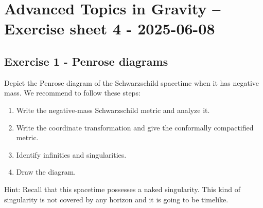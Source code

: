 \documentclass[10pt,a4paper]{article}
\theoremstyle{definition}
\begin{document}
\newpage
\section*{Advanced Topics in Gravity – Exercise sheet 4 - 2025-06-08}
\subsection*{Exercise 1 - Penrose diagrams}
{\color{blue} 
Depict the Penrose diagram of the Schwarzschild spacetime when it has negative mass. We recommend to follow these steps:
\begin{enumerate}
\item Write the negative-mass Schwarzschild metric and analyze it.
\item Write the coordinate transformation and give the conformally compactified metric.
\item Identify infinities and singularities.
\item Draw the diagram.
\end{enumerate}
Hint: Recall that this spacetime possesses a naked singularity. This kind of singularity is not covered by any horizon and it is going to be timelike.
}
\end{document}
